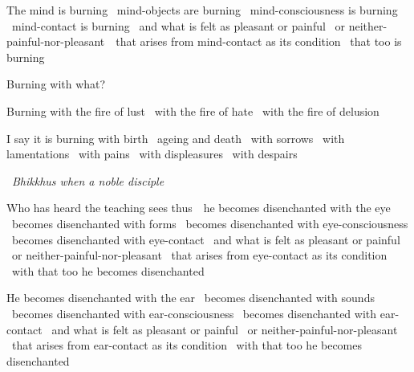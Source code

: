 \begin{english-only-hang}
  The mind is burning \breathmark\ mind-objects are burning \breathmark\ mind-consciousness is burning \breathmark\ mind-contact is burning \breathmark\ and what is felt as pleasant or painful \breathmark\ or neither-painful-nor-{pleasant}~\breathmark\ that arises from mind-contact as its condition \breathmark\ that too is burning
\end{english-only-hang}
\begin{english-only-hangtogether}
  Burning with what?
\end{english-only-hangtogether}
\begin{english-only-hangtogether}
  Burning with the fire of lust \breathmark\ with the fire of hate \breathmark\ with the fire of delusion
\end{english-only-hangtogether}
\begin{english-only-hangtogether}
  I say it is burning with birth \breathmark\ ageing and death \breathmark\ with sorrows \breathmark\ with lamentations \breathmark\ with pains \breathmark\ with displeasures \breathmark\ with despairs
\end{english-only-hangtogether}

\begin{english-only-leader}
  \anglebracketleft\ \hspace{-0.5mm}\textit{Bhikkhus when a noble disciple} \hspace{-0.5mm}\anglebracketright\
\end{english-only-leader}
\begin{english-only-hangtogether}
  Who has heard the teaching sees \mbox{thus}~\breathmark\ he becomes disenchanted with the eye \breathmark\ becomes disenchanted with forms \breathmark\ becomes disenchanted with eye-consciousness \breathmark\ becomes disenchanted with eye-contact \breathmark\ and what is felt as pleasant or painful \breathmark\ or neither-painful-nor-pleasant \breathmark\ that arises from eye-contact as its condition \breathmark\ with that too he becomes disenchanted
\end{english-only-hangtogether}

\begin{english-only-hang}
  He becomes disenchanted with the ear \breathmark\ becomes disenchanted with sounds \breathmark\ becomes disenchanted with ear-consciousness \breathmark\ becomes disenchanted with ear-contact \breathmark\ and what is felt as pleasant or painful \breathmark\ or neither-painful-nor-pleasant \breathmark\ that arises from ear-contact as its condition \breathmark\ with that too he becomes disenchanted
\end{english-only-hang}

